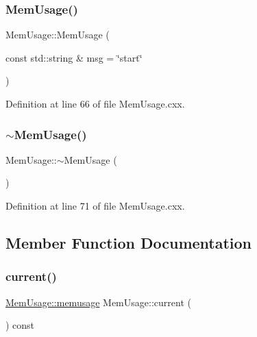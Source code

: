 \subsubsection{\texorpdfstring{Mem\+Usage()}{MemUsage()}}
{\footnotesize\ttfamily Mem\+Usage\+::\+Mem\+Usage (\begin{DoxyParamCaption}\item[{const std\+::string \&}]{msg = {\ttfamily \char`\"{}start\char`\"{}} }\end{DoxyParamCaption})}



Definition at line 66 of file Mem\+Usage.\+cxx.

\mbox{\label{class_wire_cell_1_1_mem_usage_ad49a857aebe91c9c8bb1c3cb549807ac}} 
\subsubsection{\texorpdfstring{$\sim$\+Mem\+Usage()}{~MemUsage()}}
{\footnotesize\ttfamily Mem\+Usage\+::$\sim$\+Mem\+Usage (\begin{DoxyParamCaption}{ }\end{DoxyParamCaption})}



Definition at line 71 of file Mem\+Usage.\+cxx.



\subsection{Member Function Documentation}
\mbox{\label{class_wire_cell_1_1_mem_usage_a0413f9a3a49204c96d5462dbb3922b44}} 
\subsubsection{\texorpdfstring{current()}{current()}}
{\footnotesize\ttfamily \hyperlink{class_wire_cell_1_1_mem_usage_ab022bc829c4166d0161f3c91195f062f}{Mem\+Usage\+::memusage} Mem\+Usage\+::current (\begin{DoxyParamCaption}{ }\end{DoxyParamCaption}) const}



